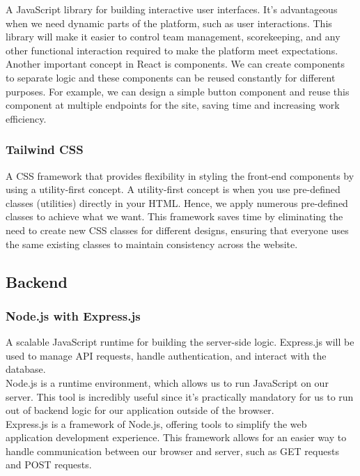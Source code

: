 \documentclass{article}
\begin{document}
A JavaScript library for building interactive user interfaces. It's advantageous when we need dynamic parts of the platform, such as user interactions. This library will make it easier to control team management, scorekeeping, and any other functional interaction required to make the platform meet expectations. \\

\noindent Another important concept in React is components. We can create components to separate logic and these components can be reused constantly for different purposes. For example, we can design a simple button component and reuse this component at multiple endpoints for the site, saving time and increasing work efficiency.
\subsubsection*{Tailwind CSS}

A CSS framework that provides flexibility in styling the front-end components by using a utility-first concept. A utility-first concept is when you use pre-defined classes (utilities) directly in your HTML. Hence, we apply numerous pre-defined classes to achieve what we want. This framework saves time by eliminating the need to create new CSS classes for different designs, ensuring that everyone uses the same existing classes to maintain consistency across the website.

\subsection*{Backend}

\subsubsection*{Node.js with Express.js}

A scalable JavaScript runtime for building the server-side logic. Express.js will be used to manage API requests, handle authentication, and interact with the database. \\

\noindent Node.js is a runtime environment, which allows us to run JavaScript on our server. This tool is incredibly useful since it's practically mandatory for us to run out of backend logic for our application outside of the browser. \\

\noindent Express.js is a framework of Node.js, offering tools to simplify the web application development experience. This framework allows for an easier way to handle communication between our browser and server, such as GET requests and POST requests.
\end{document}

